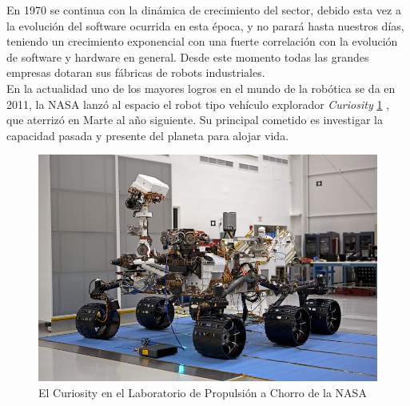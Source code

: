 En 1970 se continua con la dinámica de crecimiento del sector, debido esta vez a la evolución del software ocurrida en esta época, y no parará hasta nuestros días, teniendo un crecimiento exponencial con una fuerte correlación con la evolución de software y hardware en general.
Desde este momento todas las grandes empresas dotaran sus fábricas de robots industriales. \\

En la actualidad uno de los mayores logros en el mundo de la robótica se da en 2011, la NASA lanzó al espacio el robot tipo vehículo explorador \textit{Curiosity} \ref{fig:curiosity} , que aterrizó en Marte al año siguiente. Su principal cometido es investigar la capacidad pasada y presente del planeta para alojar vida.\\

\begin{figure}[H]
    \centering
    \includegraphics[scale=0.95]{img/curiosity.jpg}
  	\caption{El Curiosity en el Laboratorio de Propulsión a Chorro de la NASA}
  	\label{fig:curiosity}
\end{figure}

